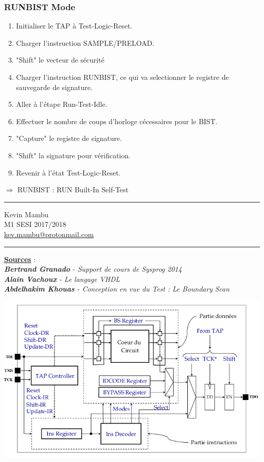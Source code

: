 \documentclass[10pt]{article}
\begin{document}
\begin{multicols}{2}
  \subsubsection{RUNBIST Mode}
  \begin{enumerate}
    \itemsep0em
    \item Initialiser le TAP à Test-Logic-Reset.
    \item Charger l'instruction SAMPLE/PRELOAD.
    \item "Shift" le vecteur de sécurité
    \item Charger l'instruction RUNBIST, ce qui va selectionner le registre de
    sauvegarde de signature.
    \item Aller à l'étape Run-Test-Idle.
    \item Effectuer le nombre de coups d'horloge cécessaires pour le BIST.
    \item "Capture" le registre de signature.
    \item "Shift" la signature pour vérification.
    \item Revenir à l'état Test-Logic-Reset.
  \end{enumerate}
  $\Rightarrow$ RUNBIST : RUN Built-In Self-Test
  \vfill
  \hrule\vspace{.5em}
  \noindent Kevin Mambu\\
  M1 SESI 2017/2018\\
  \url{kev.mambu@protonmail.com}\\[1em]
  \hrule\vspace{.5em}
  \noindent\underline{\textbf{Sources}} :\\
  \textit{
  \textbf{Bertrand Granado} - Support de cours de Sysprog 2014\\
  \textbf{Alain Vachoux} - Le langage VHDL\\
  \textbf{Abdelhakim Khouas} - Conception en vue du Test : Le Boundary Scan}
\end{multicols}
\newpage
\includegraphics[angle=90]{fatman.png}
\end{document}
